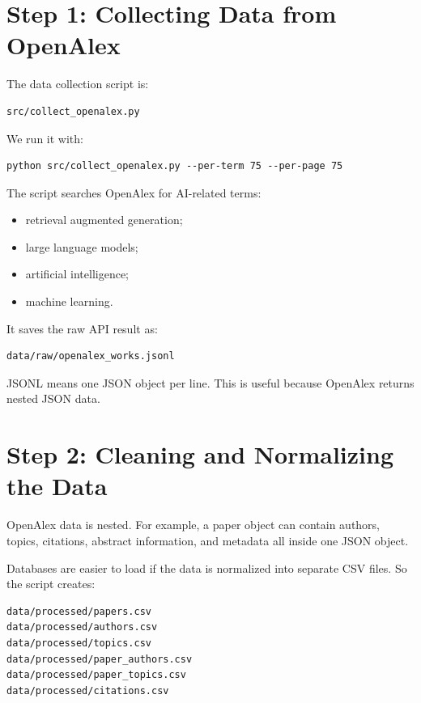 \documentclass[11pt]{article}
\begin{document}
\section{Step 1: Collecting Data from OpenAlex}

The data collection script is:

\begin{verbatim}
src/collect_openalex.py
\end{verbatim}

We run it with:

\begin{verbatim}
python src/collect_openalex.py --per-term 75 --per-page 75
\end{verbatim}

The script searches OpenAlex for AI-related terms:

\begin{itemize}
    \item retrieval augmented generation;
    \item large language models;
    \item artificial intelligence;
    \item machine learning.
\end{itemize}

It saves the raw API result as:

\begin{verbatim}
data/raw/openalex_works.jsonl
\end{verbatim}

JSONL means one JSON object per line.
This is useful because OpenAlex returns nested JSON data.

\section{Step 2: Cleaning and Normalizing the Data}

OpenAlex data is nested.
For example, a paper object can contain authors, topics, citations, abstract information, and metadata all inside one JSON object.

Databases are easier to load if the data is normalized into separate CSV files.
So the script creates:

\begin{verbatim}
data/processed/papers.csv
data/processed/authors.csv
data/processed/topics.csv
data/processed/paper_authors.csv
data/processed/paper_topics.csv
data/processed/citations.csv
\end{verbatim}
\end{document}

